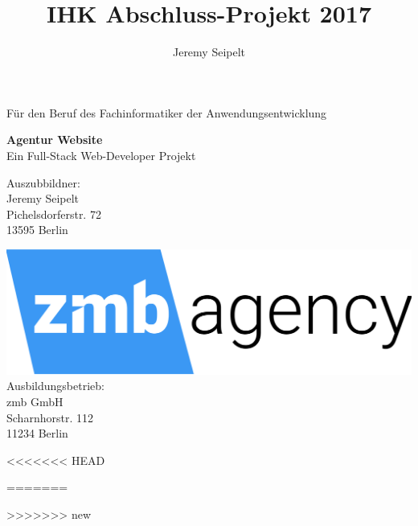 \documentclass[11pt,a4paper]{article}
\author{Jeremy Seipelt}
\title{IHK Abschluss-Projekt 2017}
\begin{document}
\clearpage\maketitle
\thispagestyle{empty}
	\begin{center}
		\begin{Large}


			Für den Beruf des Fachinformatiker der Anwendungsentwicklung\\

		\end{Large}
	\end{center}

 	\begin{center}
		\begin{LARGE}
			 \textbf{Agentur Website}\\
		 Ein Full-Stack Web-Developer Projekt
		\end{LARGE}
	\end{center}

	\begin{center}
	Auszubbildner: \\
 	Jeremy Seipelt\\
 	Pichelsdorferstr. 72\\
	 13595 Berlin\\
	\end{center}

	\begin{center}
		\includegraphics[scale=0.05]{logo_zmb}\\
 		Ausbildungsbetrieb:\\
 		zmb GmbH\\
 		Scharnhorstr. 112\\
 		11234 Berlin \\
 	\end{center}
\newpage
\tableofcontents
\newpage
\begin{acronym}
<<<<<<< HEAD


=======

>>>>>>> new

\end{acronym}
\begin{acronym}[Allgemein]
\end{acronym}
\newpage
\setcounter{page}{1}
\end{document}
